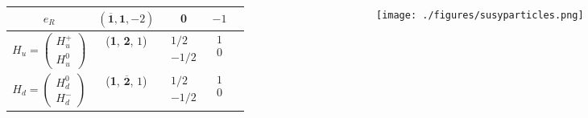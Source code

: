 \documentclass[hyperref={bookmarks=false},aspectratio=169]{beamer}
\begin{document}
\begin{frame}
{\begin{minipage}[t][0.5\textheight][t]{\textwidth}
\begin{columns}
\begin{column}{0.5\textwidth}
\begin{table}[]
{\begin{tabular}{c|c|c|c|c}
							$e_R $ & $(\overline{\textbf{1}}, \textbf{1}, -2)$ & 0 & $-1$ \\ \hline \hline
							
							
							
							$H_u=\begin{pmatrix} 
							H_u^+  \\
							H_u^0 
							\end{pmatrix}$	  & (\textbf{1}, \textbf{2}, $1$)  & $\begin{matrix} 
							1/2  \\
							-1/2 
							\end{matrix}$  & $\begin{matrix} 
							1  \\
							0 
							\end{matrix}$  \\ \hline
							
							$H_d=\begin{pmatrix} 
							H_d^0  \\
							H_d^- 
							\end{pmatrix}$	  & (\textbf{1}, $\overline{\textbf{2}}$, $1$)  & $\begin{matrix} 
							1/2  \\
							-1/2 
							\end{matrix}$  & $\begin{matrix} 
							1  \\
							0 
							\end{matrix}$  \\ \hline
							
					\end{tabular}}
				\end{table}
			\end{column}
			\begin{column}{0.5\textwidth}
				\color{black}
				\centering
				\vspace{-1.0cm}
				\begin{figure}
					\texttt{[image: ./figures/susyparticles.png]}
				\end{figure}
			\end{column}
		\end{columns}
	\end{minipage}
	
	\pause
	
	\nointerlineskip
	
}
\end{frame}
\end{document}

